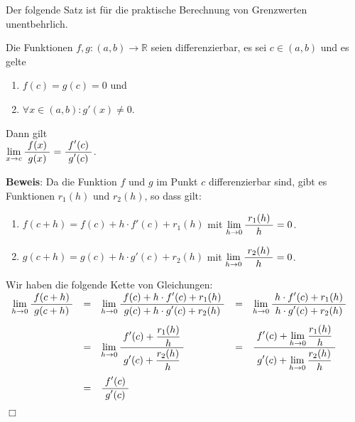Der folgende Satz ist f\"ur die praktische Berechnung von Grenzwerten unentbehrlich.

\begin{Satz} \lb 
  Die Funktionen $f,g: (a,b) \rightarrow \mathbb{R}$ seien
  differenzierbar, es sei $c \in (a,b)$ und es gelte
  \begin{enumerate}
  \item $f(c) = g(c) = 0$ \quad und
  \item $\forall x \in (a,b):  g'(x) \not= 0$.
  \end{enumerate}
  Dann gilt 
  \\[0.3cm]
  \hspace*{1.3cm}
  $\lim\limits_{x \rightarrow c} \displaystyle\frac{\;\displaystyle f(x)\;}{\;\displaystyle g(x)\;} = \displaystyle\frac{\;\displaystyle f'(c)\;}{\;\displaystyle g'(c)\;}$.
\end{Satz}

\noindent
\textbf{Beweis}: 
Da die Funktion $f$ und $g$ im Punkt $c$ differenzierbar sind, gibt es Funktionen $r_1(h)$
und $r_2(h)$, so dass gilt:
\begin{enumerate}
\item $f(c+h) = f(c) + h\cdot f'(c) + r_1(h)$ \quad mit $\lim\limits_{h \rightarrow 0} \displaystyle\frac{\;\displaystyle r_1(h)\;}{\;\displaystyle h\;} = 0$.
\item $g(c+h) = g(c) + h\cdot g'(c) + r_2(h)$ \quad mit $\lim\limits_{h \rightarrow 0} \displaystyle\frac{\;\displaystyle r_2(h)\;}{\;\displaystyle h\;} = 0$.
\end{enumerate}
Wir haben die folgende Kette von Gleichungen:
\\[0.3cm]
\hspace*{1.3cm}
$
\begin{array}[b]{lclcl}
    \lim\limits_{h \rightarrow 0} \displaystyle\frac{\;\displaystyle f(c+h)\;}{\;\displaystyle g(c+h)\;} &=&
    \lim\limits_{h \rightarrow 0} \displaystyle\frac{\;\displaystyle f(c) + h\cdot f'(c) + r_1(h)\;}{\;\displaystyle g(c) + h\cdot g'(c) + r_2(h)\;} 
&=& \lim\limits_{h \rightarrow 0} \displaystyle\frac{\;\displaystyle h\cdot f'(c) + r_1(h)\;}{\;\displaystyle h\cdot g'(c) + r_2(h)\;} \\[0.5cm]
&=& \lim\limits_{h \rightarrow 0} \displaystyle\frac{\;\displaystyle f'(c) + \frac{r_1(h)}{h}\;}{\;\displaystyle g'(c) + \frac{r_2(h)}{h}\;} 
&=& \displaystyle\frac{\;\displaystyle f'(c) + \lim\limits_{h \rightarrow 0} \frac{r_1(h)}{h}\;}{\;\displaystyle g'(c) + \lim\limits_{h \rightarrow 0} \frac{r_2(h)}{h}\;} \\[0.8cm]
&=& \displaystyle\frac{\;\displaystyle f'(c)\;}{\;\displaystyle g'(c)\;} \\[0.5cm]
\end{array}
$
\hspace*{\fill} $\Box$


